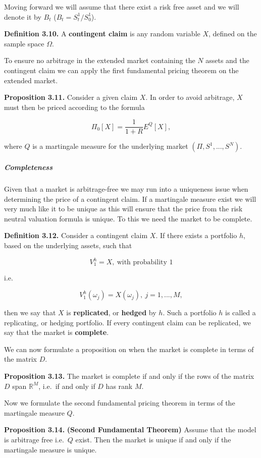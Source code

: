 \documentclass[
]{article}
\begin{document}
Moving forward we will assume that there exist a risk free asset and we
will denote it by \(B_t\) (\(B_t=S^1_t/S^1_0\)).

\textbf{Definition 3.10.} A \textbf{contingent claim} is any random
variable \(X\), defined on the sample space \(\Omega\).

To ensure no arbitrage in the extended market containing the \(N\)
assets and the contingent claim we can apply the first fundamental
pricing theorem on the extended market.

\textbf{Proposition 3.11.} Consider a given claim \(X\). In order to
avoid arbitrage, \(X\) must then be priced according to the formula

\[
\Pi_0[X]=\frac{1}{1+R}E^Q[X],\tag{3.10}
\]

where \(Q\) is a martingale measure for the underlying market
\((\Pi,S^1,...,S^N)\).

\hypertarget{completeness}{%
\subparagraph{Completeness}\label{completeness}}

Given that a market is arbitrage-free we may run into a uniqueness issue
when determining the price of a contingent claim. If a martingale
measure exist we will very much like it to be unique as this will ensure
that the price from the risk neutral valuation formula is unique. To
this we need the market to be complete.

\textbf{Definition 3.12.} Consider a contingent claim \(X\). If there
exists a portfolio \(h\), based on the underlying assets, such that

\[
V_1^h=X,\ \text{with probability 1}\tag{3.11}
\]

i.e.

\[
V_1^h(\omega_j)=X(\omega_j),\ j=1,...,M,\tag{3.12}
\]

then we say that \(X\) is \textbf{replicated}, or \textbf{hedged} by
\(h\). Such a portfolio \(h\) is called a replicating, or hedging
portfolio. If every contingent claim can be replicated, we say that the
market is \textbf{complete}.

We can now formulate a proposition on when the market is complete in
terms of the matrix \(D\).

\textbf{Proposition 3.13.} The market is complete if and only if the
rows of the matrix \(D\) span \(\mathbb{R}^M\), i.e.~if and only if
\(D\) has rank \(M\).

Now we formulate the second fundamental pricing theorem in terms of the
martingale measure \(Q\).

\textbf{Proposition 3.14.} \textbf{(Second Fundamental Theorem)} Assume
that the model is arbitrage free i.e.~\(Q\) exist. Then the market is
unique if and only if the martingale measure is unique.
\end{document}
